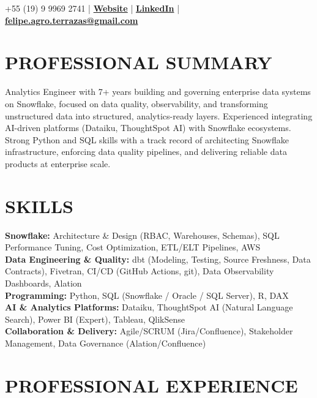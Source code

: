 \documentclass[9pt, letterpaper]{article}
\begin{document}
	\pagestyle{empty}

	 \hfill +55 (19) 9 9969 2741 | \href{https://feliperamiresterrazas.github.io/professionalwebsite/}{\textbf{Website}} | \href{https://www.linkedin.com/in/felipe-ramires-terrazas/}{\textbf{LinkedIn}} |
	\\
	 \hfill \href{mailto:felipe.agro.terrazas@gmail.com}{\textbf{felipe.agro.terrazas@gmail.com}}

	\section*{PROFESSIONAL SUMMARY}
	\noindent Analytics Engineer with 7+ years building and governing enterprise data systems on Snowflake, focused on data quality, observability, and transforming unstructured data into structured, analytics-ready layers. Experienced integrating AI-driven platforms (Dataiku, ThoughtSpot AI) with Snowflake ecosystems. Strong Python and SQL skills with a track record of architecting Snowflake infrastructure, enforcing data quality pipelines, and delivering reliable data products at enterprise scale.

	\section*{SKILLS}
	\noindent \textbf{Snowflake:} Architecture \& Design (RBAC, Warehouses, Schemas), SQL Performance Tuning, Cost Optimization, ETL/ELT Pipelines, AWS \\
	\noindent \textbf{Data Engineering \& Quality:} dbt (Modeling, Testing, Source Freshness, Data Contracts), Fivetran, CI/CD (GitHub Actions, git), Data Observability Dashboards, Alation \\
	\noindent \textbf{Programming:} Python, SQL (Snowflake / Oracle / SQL Server), R, DAX \\
	\noindent \textbf{AI \& Analytics Platforms:} Dataiku, ThoughtSpot AI (Natural Language Search), Power BI (Expert), Tableau, QlikSense \\
	\noindent \textbf{Collaboration \& Delivery:} Agile/SCRUM (Jira/Confluence), Stakeholder Management, Data Governance (Alation/Confluence)

	\section*{PROFESSIONAL EXPERIENCE}
\end{document}
